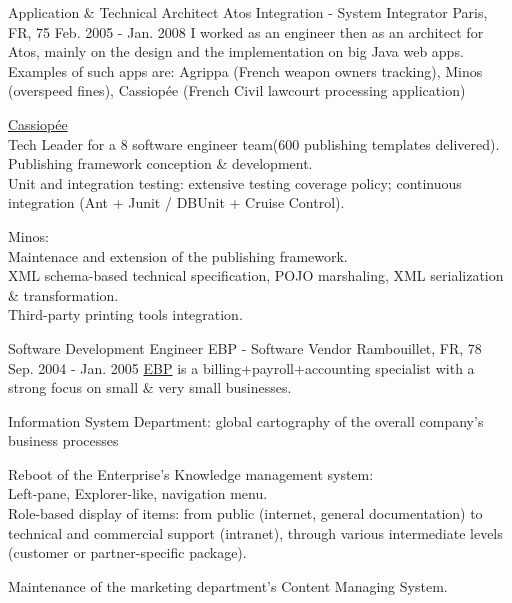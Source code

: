 \begin{cventries}
  \cventry
    {Application \& Technical Architect} %
    {Atos Integration - System Integrator} %
    {Paris, FR, 75} %
    {Feb. 2005 - Jan. 2008} %
{
I worked as an engineer then as an architect for Atos, mainly on the design and the implementation on big Java web apps. Examples of such apps are: Agrippa (French weapon owners tracking), Minos (overspeed fines), Cassiopée (French Civil lawcourt processing application)
} %
{
      \begin{cvitems} %
        \item {\href{http://www.justice.gouv.fr/template/cache/embeds/embed-2086.html}{Cassiopée}\\Tech Leader for a 8 software engineer team(600 publishing templates delivered).\\Publishing framework conception \& development.\\Unit and integration testing: extensive testing coverage policy; continuous integration (Ant + Junit / DBUnit + Cruise Control).}
        \item {Minos:\\Maintenace and extension of the publishing framework.\\XML schema-based technical specification, POJO marshaling, XML serialization \& transformation.\\Third-party printing tools integration.}
      \end{cvitems}
} %

  \cventry
    {Software Development Engineer} %
    {EBP - Software Vendor} %
    {Rambouillet, FR, 78} %
    {Sep. 2004 - Jan. 2005} %
    {\href{https://www.ebp.com}{EBP} is a billing+payroll+accounting specialist with a strong focus on small \& very small businesses.} %
{
      \begin{cvitems} %
        \item {Information System Department: global cartography of the overall company's business processes}
        \item {Reboot of the Enterprise’s Knowledge management system:\\Left-pane, Explorer-like, navigation menu.\\Role-based display of items: from public (internet, general documentation) to technical and commercial support (intranet), through various intermediate levels (customer or partner-specific package).}
        \item {Maintenance of the marketing department's Content Managing System.}
      \end{cvitems}
} %


\end{cventries}
